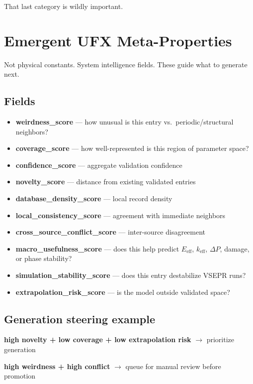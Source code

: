 \documentclass[11pt, a4paper]{article}
\begin{document}
That last category is wildly important.

\section{Emergent UFX Meta-Properties}

Not physical constants. System intelligence fields. These guide what to generate next.

\subsection{Fields}

\begin{itemize}[itemsep=2pt, leftmargin=*]
  \item \textbf{weirdness\_score} --- how unusual is this entry vs.\ periodic/structural neighbors?
  \item \textbf{coverage\_score} --- how well-represented is this region of parameter space?
  \item \textbf{confidence\_score} --- aggregate validation confidence
  \item \textbf{novelty\_score} --- distance from existing validated entries
  \item \textbf{database\_density\_score} --- local record density
  \item \textbf{local\_consistency\_score} --- agreement with immediate neighbors
  \item \textbf{cross\_source\_conflict\_score} --- inter-source disagreement
  \item \textbf{macro\_usefulness\_score} --- does this help predict $E_\text{eff}$, $k_\text{eff}$, $\Delta P$, damage, or phase stability?
  \item \textbf{simulation\_stability\_score} --- does this entry destabilize VSEPR runs?
  \item \textbf{extrapolation\_risk\_score} --- is the model outside validated space?
\end{itemize}

\subsection{Generation steering example}

\begin{phasebox}
\textbf{high novelty + low coverage + low extrapolation risk} $\rightarrow$ prioritize generation

\textbf{high weirdness + high conflict} $\rightarrow$ queue for manual review before promotion
\end{phasebox}
\end{document}
